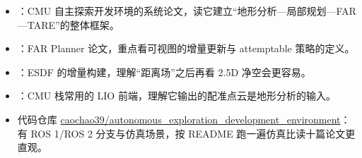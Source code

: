 \begin{reading}

\begin{itemize}
  \item \cite{cao2022tare}：CMU 自主探索开发环境的系统论文，读它建立“地形分析—局部规划—FAR—TARE”的整体框架。
  \item \cite{yang2022farplanner}：FAR Planner 论文，重点看可视图的增量更新与 attemptable 策略的定义。
  \item \cite{oleynikova2017voxblox}：ESDF 的增量构建，理解“距离场”之后再看 2.5D 净空会更容易。
  \item \cite{xu2022fastlio2}：CMU 栈常用的 LIO 前端，理解它输出的配准点云是地形分析的输入。
  \item 代码仓库 \href{https://github.com/caochao39/autonomous_exploration_development_environment}{caochao39/autonomous\_exploration\_development\_environment}：有 ROS 1/ROS 2 分支与仿真场景，按 README 跑一遍仿真比读十篇论文更直观。
\end{itemize}


\end{reading}
